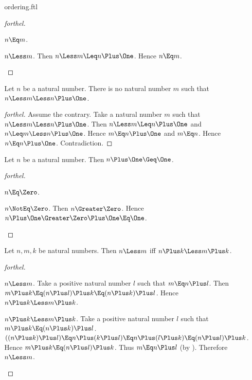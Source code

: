\documentclass{stex}
\begin{document}
\begin{smodule}{ordering.ftl}
\begin{proof}[forthel]
  \begin{case}{$n \Eq m$.} \end{case}

  \begin{case}{$n \Less m$.}
    Then $n \Less m \Leq n \Plus \One$.
    Hence $n \Eq m$.
  \end{case}
\end{proof}

\begin{proposition*}[forthel]
  Let $n$ be a natural number.
  There is no natural number $m$ such that $n \Less m \Less n \Plus \One$.
\end{proposition*}
\begin{proof}[forthel]
  Assume the contrary.
  Take a natural number $m$ such that $n \Less m \Less n \Plus \One$.
  Then $n \Less m \Leq n \Plus \One$ and $n \Leq m \Less n \Plus \One$.
  Hence $m \Eq n \Plus \One$ and $m \Eq n$.
  Hence $n \Eq n \Plus \One$.
  Contradiction.
\end{proof}

\begin{proposition*}[forthel]
  Let $n$ be a natural number.
  Then $n \Plus \One \Geq \One$.
\end{proposition*}
\begin{proof}[forthel]
  \begin{case}{$n \Eq \Zero$.} \end{case}

  \begin{case}{$n \NotEq \Zero$.}
    Then $n \Greater \Zero$.
    Hence $n \Plus \One \Greater \Zero \Plus \One \Eq \One$.
  \end{case}
\end{proof}

\begin{proposition*}[forthel,name=preservation of ordering under right-addition]
  Let $n, m, k$ be natural numbers.
  Then $n \Less m$ iff $n \Plus k \Less m \Plus k$.
\end{proposition*}
\begin{proof}[forthel]
  \begin{case}{$n \Less m$.}
    Take a positive natural number $l$ such that $m \Eq n \Plus l$.
    Then $m \Plus k
      \Eq (n \Plus l) \Plus k
      \Eq (n \Plus k) \Plus l$.
    Hence $n \Plus k \Less m \Plus k$.
  \end{case}

  \begin{case}{$n \Plus k \Less m \Plus k$.}
    Take a positive natural number $l$ such that $m \Plus k \Eq (n \Plus k) \Plus l$.
    $((n \Plus k) \Plus l)
      \Eq n \Plus (k \Plus l)
      \Eq n \Plus (l \Plus k)
      \Eq (n \Plus l) \Plus k$.
    Hence $m \Plus k \Eq (n \Plus l) \Plus k$.
    Thus $m \Eq n \Plus l$ (by ).
    Therefore $n \Less m$.
  \end{case}
\end{proof}


\end{smodule}
\end{document}
